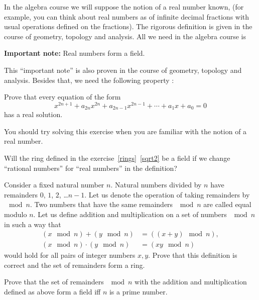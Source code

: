 \documentclass[12pt]{article}
\begin{document}
In the algebra course we will suppose the notion of a real number
known, (for example, you can think about real numbers as of infinite
decimal fractions with usual operations defined on the fractions). The
rigorous definition is given in the course of geometry, topology and
analysis. All we need in the algebra course is

\medskip

\noindent
{\bf Important note:} Real numbers form a field.

\medskip

This ``important note'' is also proven in the course of geometry,
topology and analysis. Besides that, we need the following property :

\begin{zadacha}[*]
Prove that every equation of the form
$$
x^{2n+1} + a_{2n} x^{2n} + a_{2n-1} x^{2n-1} + \cdots + a_1 x + a_0 =0
$$
has a real solution.
\end{zadacha}

You should try solving this exercise when you are familiar with the
notion of a real number.

\begin{zadacha}[*]
Will the ring defined in the exercise~\ref{rings}~\ref{sqrt2} be a
field if we change ``rational numbers'' for ``real numbers'' in the
definition?
\end{zadacha}

\begin{zadacha} Consider a fixed natural number $n$. Natural numbers
  divided by $n$ have remainders $0$, $1$, $2$, \dots $n-1$.  Let us
  denote the operation of taking remainders by $\mod n$. Two numbers
  that have the same remainders $\mod n$ are called equal modulo $n$.
  Let us define addition and multiplication on a set of numbers $\mod
  n$ in such a way that
\begin{align*}
(x \mod n) + (y \mod n) &= ((x  + y) \mod n), \\
(x \mod n) \cdot (y \mod n) &= (xy \mod n)
\end{align*}
would hold for all pairs of integer numbers $x, y$.  Prove that this
definition is correct and the set of remainders form a ring.
\end{zadacha}

\begin{zadacha}[*]\label{modulo}
Prove that the set of remainders $\mod n$ with the addition and
multiplication defined as above form a field iff $n$ is a prime
number.
\end{zadacha}
\end{document}
